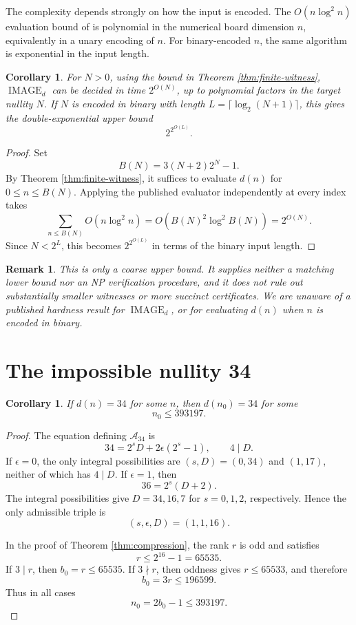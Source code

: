 \documentclass[a4paper]{article}
\newtheorem{corollary}[theorem]{Corollary}
\newtheorem{remark}[theorem]{Remark}
\begin{document}
The complexity depends strongly on how the input is encoded.
The $O(n\log^2 n)$ evaluation bound of
\cite{GoldwasserKlostermeyerTrapp1997} is polynomial in the numerical
board dimension $n$, equivalently in a unary encoding of $n$.
For binary-encoded $n$, the same algorithm is exponential in the input
length.

\begin{corollary}\label{cor:complexity}
	For $N>0$, using the bound in Theorem \ref{thm:finite-witness},
	$\operatorname{IMAGE}_d$ can be decided in time $2^{O(N)}$, up to
	polynomial factors in the target nullity $N$.
	If $N$ is encoded in binary with length
	$L=\lceil\log_2(N+1)\rceil$, this gives the
	double-exponential upper bound
	\[
		2^{2^{O(L)}}.
	\]
\end{corollary}

\begin{proof}
	Set
	\[
		B(N)=3(N+2)2^N-1.
	\]
	By Theorem \ref{thm:finite-witness}, it suffices to evaluate $d(n)$
	for $0\leq n\leq B(N)$.
	Applying the published evaluator independently at every index takes
	\[
		\sum_{n\leq B(N)}O(n\log^2 n)
		=
		O(B(N)^2\log^2 B(N))
		=
		2^{O(N)}.
	\]
	Since $N<2^L$, this becomes $2^{2^{O(L)}}$ in terms of the binary
	input length.
\end{proof}

\begin{remark}
	This is only a coarse upper bound.
	It supplies neither a matching lower bound nor an NP verification
	procedure, and it does not rule out substantially smaller witnesses
	or more succinct certificates.
	We are unaware of a published hardness result for
	$\operatorname{IMAGE}_d$, or for evaluating $d(n)$ when $n$ is
	encoded in binary.
\end{remark}

\section{The impossible nullity 34}

\begin{corollary}\label{cor:34-bound}
	If $d(n)=34$ for some $n$, then $d(n_0)=34$ for some
	\[
		n_0\leq393197.
	\]
\end{corollary}

\begin{proof}
	The equation defining $\mathcal{A}_{34}$ is
	\[
		34=2^sD+2\epsilon(2^s-1),
		\qquad
		4\mid D.
	\]
	If $\epsilon=0$, the only integral possibilities are
	$(s,D)=(0,34)$ and $(1,17)$, neither of which has $4\mid D$.
	If $\epsilon=1$, then
	\[
		36=2^s(D+2).
	\]
	The integral possibilities give $D=34,16,7$ for $s=0,1,2$,
	respectively.
	Hence the only admissible triple is
	\[
		(s,\epsilon,D)=(1,1,16).
	\]

	In the proof of Theorem \ref{thm:compression}, the rank $r$ is odd
	and satisfies
	\[
		r\leq2^{16}-1=65535.
	\]
	If $3\mid r$, then $b_0=r\leq65535$.
	If $3\nmid r$, then oddness gives $r\leq65533$, and therefore
	\[
		b_0=3r\leq196599.
	\]
	Thus in all cases
	\[
		n_0=2b_0-1\leq393197.
	\]
\end{proof}
\end{document}
